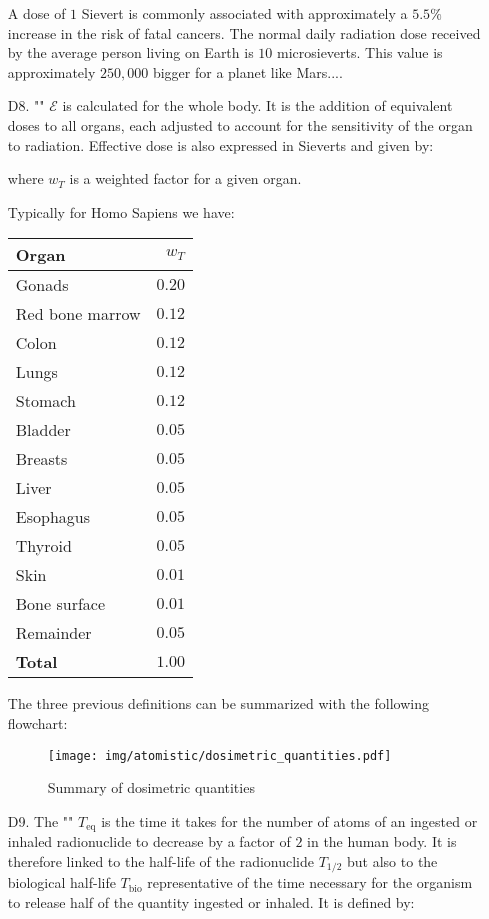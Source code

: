 \begin{enumerate}
		\begin{tcolorbox}[title=Remark,colframe=black,arc=10pt]
		A dose of $1$ Sievert is commonly associated with approximately a $5.5\%$ increase in the risk of fatal cancers. The normal daily radiation dose received by the average person living on Earth is $10$ microsieverts. This value is approximately $250,000$ bigger for a planet like Mars....
		\end{tcolorbox}
		
		\item[D8.] "" $\mathcal{E}$ is calculated for the whole body. It is the addition of equivalent doses to all organs, each adjusted to account for the sensitivity of the organ to radiation. Effective dose is also expressed in Sieverts and given by:
		
		where $w_T$ is a weighted factor for a given organ.

		Typically for Homo Sapiens we have:
		\begin{center}
			\begin{tabular}{||l|r||}
			\hline
			{\bf Organ}&\boldmath$w_T$\unboldmath\\
			\hline
			\hline
			Gonads & $0.20$\\
			Red bone marrow & $0.12$\\
			Colon & $0.12$\\
			Lungs & $0.12$\\
			Stomach & $0.12$\\
			Bladder & $0.05$\\
			Breasts & $0.05$\\
			Liver & $0.05$\\
			Esophagus & $0.05$\\
			Thyroid & $0.05$\\
			Skin & $0.01$\\
			Bone surface & $0.01$\\
			Remainder & $0.05$\\
			\hline
			\textbf{Total} & $1.00$\\
			\hline
			\end{tabular}
		\end{center}
		
		The three previous definitions can be summarized with the following flowchart:
		\begin{figure}[H]
			\centering
			\texttt{[image: img/atomistic/dosimetric\_quantities.pdf]}
			\caption[]{Summary of dosimetric quantities}
		\end{figure}
		
		\item[D9.] The "" $T_\text{eq}$ is the time it takes for the number of atoms of an ingested or inhaled radionuclide to decrease by a factor of $2$ in the human body. It is therefore linked to the half-life of the radionuclide $T_{1/2}$ but also to the biological half-life $T_\text{bio}$ representative of the time necessary for the organism to release half of the quantity ingested or inhaled. It is defined by:
		
	\end{enumerate}

